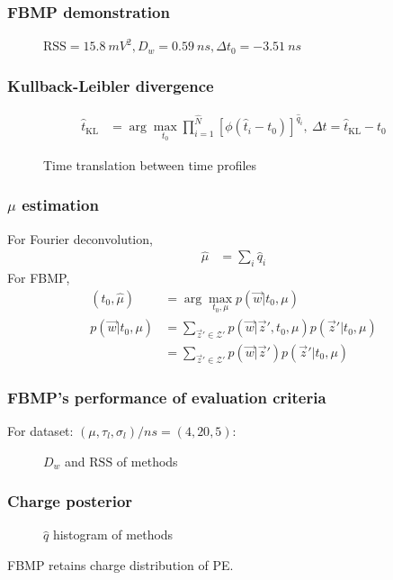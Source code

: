 \documentclass{beamer}
\begin{document}
\begin{CJK*}{UTF8}{gbsn}
\begin{frame}
\frametitle{FBMP demonstration}
\begin{figure}
    \centering
    \resizebox{0.6\textwidth}{!}{}
    \caption{$\mathrm{RSS}=\SI{15.8}{mV^2},D_w=\SI{0.59}{ns},\Delta t_0=\SI{-3.51}{ns}$}
\end{figure}
\end{frame}

\begin{frame}
\frametitle{Kullback-Leibler divergence}
\begin{align*}
  \hat{t}_\mathrm{KL} &= \arg\underset{t_0}{\max} \prod_{i=1}^{\hat{N}} \left[\phi(\hat{t}_i-t_0)\right]^{\hat{q}_i} ,\ \Delta t = \hat{t}_\mathrm{KL} - t_0
\end{align*}
\begin{figure}
    \centering
    \resizebox{0.6\textwidth}{!}{}
    \caption{Time translation between time profiles}
\end{figure}
\end{frame}

\begin{frame}
\frametitle{$\mu$ estimation}
For Fourier deconvolution, 
\begin{align*}
    \hat{\mu} &= \sum_i \hat{q}_i
\end{align*}
For FBMP,
\begin{align*}
    \left(\hat{t}_0, \hat{\mu}\right) &= \arg\underset{t_0,\mu}{\max} p(\vec{w} | t_0, \mu) \\
    p(\vec{w}|t_0, \mu) &= \sum_{\vec{z}'\in\mathcal{Z}'}p(\vec{w}|\vec{z}',t_0,\mu)p(\vec{z}'|t_0,\mu) \\
    &= \sum_{\vec{z}'\in\mathcal{Z}'}p(\vec{w}|\vec{z}')p(\vec{z}'|t_0,\mu)
\end{align*}
\end{frame}

\begin{frame}
\frametitle{FBMP's performance of evaluation criteria}
For dataset: $(\mu, \tau_l, \sigma_l)/\si{ns}=(4, 20, 5)$: 
\begin{figure}
    \centering
    \resizebox{\textwidth}{!}{}
    \caption{$D_w$ and $\mathrm{RSS}$ of methods}
\end{figure}
\end{frame}

\begin{frame}
\frametitle{Charge posterior}
\begin{figure}
    \centering
    \resizebox{0.7\textwidth}{!}{}
    \caption{$\hat{q}$ histogram of methods}
\end{figure}
\begin{block}{}
FBMP retains charge distribution of PE. 
\end{block}
\end{frame}


\end{CJK*}
\end{document}
